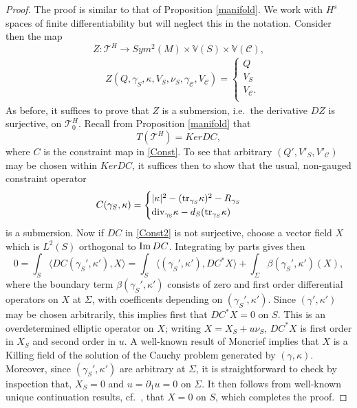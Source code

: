 \documentclass[10pt]{amsart}
\renewcommand{\b}{\beta}
\newcommand{\g}{\gamma}
\newcommand{\Si}{\Sigma}
\renewcommand{\k}{\kappa}
\newcommand{\cC}{{\mathcal C}}
\newcommand{\cT}{{\mathcal T}}
\newcommand{\bV}{\mathbb V}
\newcommand{\be}{\begin{equation}}
\newcommand{\ee}{\end{equation}}
\newcommand{\tr}{\mathrm{tr}}
\newcommand{\p}{\partial}
\renewcommand{\to}{\rightarrow}
\newcommand{\<}{\langle}
\renewcommand{\>}{\rangle}
\theoremstyle{plain}
\theoremstyle{remark}
\theoremstyle{definition}
\numberwithin{equation}{section}
\begin{document}
\begin{proof}
The proof is similar to that of Proposition \ref{manifold}. We work with $H^s$ spaces of finite differentiability but will neglect this in the notation. 
Consider then the map 
$$Z: \cT^H \to Sym^2(M) \times \bV(S) \times \bV(\cC),$$
\be \label{Zsub} 
\begin{split}
&Z(Q, \g_S, \k, V_S, \nu_S, \g_{\cC}, V_{\cC}) = 
\begin{cases}
Q \\
V_S \\
V_{\cC}.\\
\end{cases}
\end{split}
\ee
As before, it suffices to prove that $Z$ is a submersion, i.e.~the derivative $DZ$ is surjective, on $\cT_0^H$. Recall from Proposition \ref{manifold} that 
$$T(\cT^H) = Ker DC,$$
where $C$ is the constraint map in \eqref{Const}. To see that arbitrary $(Q', V'_S, V'_{\cC})$ may be chosen within $Ker DC$, it suffices then to show that 
the usual, non-gauged constraint operator 
\be \label{Const2}
\begin{split}
& C(\g_S, \k) = 
\begin{cases}
|\k|^2 - (\tr_{\g_S}\k)^2  - R_{\g_S} \\
{\rm div_{\g_S}}  \k - d_S(\tr_{\g_S}\k)  \\
\end{cases}
\end{split}
\ee
is a submersion. Now if $DC$ in \eqref{Const2} is not surjective, choose a vector field $X$ which is $L^2(S)$ orthogonal to ${\rm Im} \, DC$. Integrating by parts gives then 
$$0 = \int_S\< DC(\g_S', \k'), X\> = \int_S \<(\g_S',\k'), DC^*X\> + \int_{\Si} \b(\g_S',\k')(X),$$
where the boundary term $\b(\g_S',\k')$ consists of zero and first order differential operators on $X$ at $\Si$, with coefficents depending on $(\g_S',\k')$. 
Since $(\g',\k')$ may be chosen arbitrarily, this implies first that $DC^*X = 0$ on $S$. This is an overdetermined elliptic operator on $X$; writing $X = 
X_S + u\nu_S$, $DC^*X$ is first order in $X_S$ and second order in $u$. A well-known result of Moncrief \cite{Mon} implies that 
$X$ is a Killing field of the solution of the Cauchy problem generated by $(\g, \k)$. Moreover, since $(\g_S', \k')$ are arbitrary at $\Si$, it is 
straightforward to check by inspection that, $X_S = 0$ and $u = \p_1 u = 0$ on $\Si$. It then follows from well-known unique continuation results, cf.~\cite{Ar}, 
that $X = 0$ on $S$, which completes the proof. 

\end{proof} 
\end{document}
